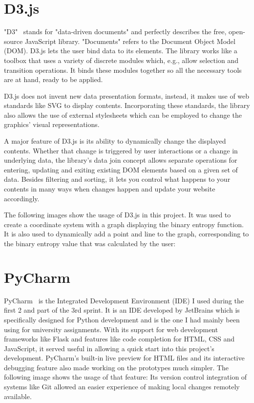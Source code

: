 \section{D3.js} \label{d3js}
"D3"~\cite{d3js_what_is_d3} stands for "data-driven documents" and perfectly describes the free, open-source JavaScript library. "Documents" refers to the Document Object Model (DOM). D3.js lets the user bind data to its elements. The library works like a toolbox that uses a variety of discrete modules which, e.g., allow selection and transition operations. It binds these modules together so all the necessary tools are at hand, ready to be applied.

D3.js does not invent new data presentation formats, instead, it makes use of web standards like SVG to display contents. Incorporating these standards, the library also allows the use of external stylesheets which can be employed to change the graphics' visual representations.

A major feature of D3.js is its ability to dynamically change the displayed contents. Whether that change is triggered by user interactions or a change in underlying data, the library's data join concept allows separate operations for entering, updating and exiting existing DOM elements based on a given set of data. Besides filtering and sorting, it lets you control what happens to your contents in many ways when changes happen and update your website accordingly.

The following images show the usage of D3.js in this project. It was used to create a coordinate system with a graph displaying the binary entropy function. It is also used to dynamically add a point and line to the graph, corresponding to the binary entropy value that was calculated by the user:

\section{PyCharm} \label{pycharm}
PyCharm~\cite{pycharm} is the Integrated Development Environment (IDE) I used during the first 2 and part of the 3rd sprint. It is an IDE developed by JetBrains which is specifically designed for Python development and is the one I had mainly been using for university assignments. With its support for web development frameworks like Flask and features like code completion for HTML, CSS and JavaScript, it served useful in allowing a quick start into this project's development.
PyCharm's built-in live preview for HTML files and its interactive debugging feature also made working on the prototypes much simpler. The following image shows the usage of that feature:
Its version control integration of systems like Git allowed an easier experience of making local changes remotely available.

